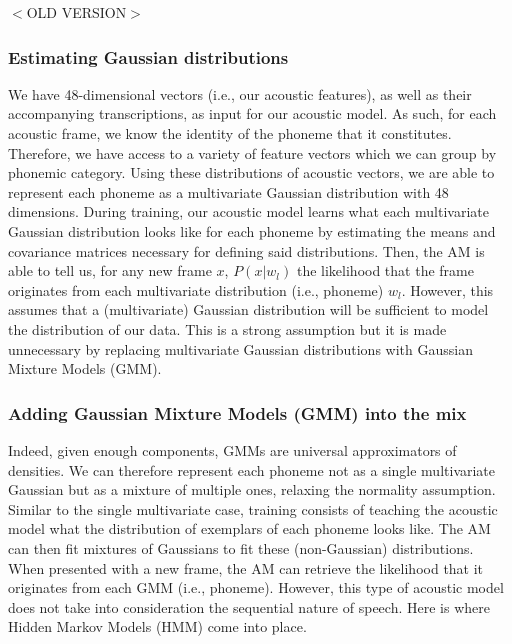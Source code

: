 {\color{red} $<$OLD VERSION$>$
\subsubsection{Estimating Gaussian distributions}
We have 48-dimensional vectors (i.e., our acoustic features), as well as their accompanying transcriptions, as input for our acoustic model. As such, for each acoustic frame, we know the identity of the phoneme that it constitutes. Therefore, we have access to a variety of feature vectors which we can group by phonemic category. Using these distributions of acoustic vectors, we are able to represent each phoneme as a multivariate Gaussian distribution with 48 dimensions. During training, our acoustic model learns what each multivariate Gaussian distribution looks like for each phoneme by estimating the means and covariance matrices necessary for defining said distributions.
Then, the AM is able to tell us, for any new frame $x$, $P(x|w_{l})$ the likelihood that the frame originates from each multivariate distribution (i.e., phoneme) $w_{l}$. However, this assumes that a (multivariate) Gaussian distribution will be sufficient to model the distribution of our data. This is a strong assumption but it is made unnecessary by replacing multivariate Gaussian distributions with Gaussian Mixture Models (GMM).

\subsubsection{Adding Gaussian Mixture Models (GMM) into the mix}
Indeed, given enough components, GMMs are universal approximators of densities. We can therefore represent each phoneme not as a single multivariate Gaussian but as a mixture of multiple ones, relaxing the normality assumption. Similar to the single multivariate case, training consists of teaching the acoustic model what the distribution of exemplars of each phoneme looks like. The AM can then fit mixtures of Gaussians to fit these (non-Gaussian) distributions. When presented with a new frame, the AM can retrieve the likelihood that it originates from each GMM (i.e., phoneme). However, this type of acoustic model does not take into consideration the sequential nature of speech. Here is where Hidden Markov Models (HMM) come into place.   

}
